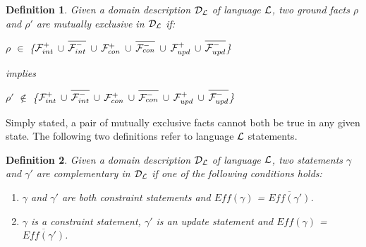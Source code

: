 \documentclass[11pt, twocolumn]{article}
\newtheorem{vdefinition}{Definition}
\newenvironment{vquote}
  {\begin{list}{}{\leftmargin 1em}\item[]}
  {\end{list}}
\begin{document}
    \begin{vdefinition}
      \label{def-mutex}
      Given a domain description ${\cal D_{L}}$ of language ${\cal L}$,
      two ground facts $\rho$ and $\rho'$ are {\em mutually exclusive}
      in ${\cal D_{L}}$ if:
      \begin{vquote}
        $\rho$ $\in$ \{${\cal F}^{+}_{int}$ $\cup$
        $\overline{{\cal F}^{-}_{int}}$ $\cup$ ${\cal F}^{+}_{con}$ $\cup$
        $\overline{{\cal F}^{-}_{con}}$ $\cup$ ${\cal F}^{+}_{upd}$ $\cup$
        $\overline{{\cal F}^{-}_{upd}}$\}

        implies

        $\rho'$ $\not\in$ \{${\cal F}^{+}_{int}$ $\cup$
        $\overline{{\cal F}^{-}_{int}}$ $\cup$ ${\cal F}^{+}_{con}$ $\cup$
        $\overline{{\cal F}^{-}_{con}}$ $\cup$ ${\cal F}^{+}_{upd}$ $\cup$
        $\overline{{\cal F}^{-}_{upd}}$\}
      \end{vquote}
    \end{vdefinition}

    Simply stated, a pair of mutually exclusive facts cannot both be true
    in any given state. The following two definitions refer to language
    ${\cal L}$ statements.

    \begin{vdefinition}
      \label{def-comp}
      Given a domain description ${\cal D_{L}}$ of language ${\cal L}$,
      two statements $\gamma$ and $\gamma'$ are {\em complementary} in
      ${\cal D_{L}}$ if one of the following conditions holds:
      \begin{enumerate}
        \item
          $\gamma$ and $\gamma'$ are both constraint statements and
          $Eff(\gamma)$ = $\overline{Eff(\gamma')}$.
        \item
          $\gamma$ is a constraint statement, $\gamma'$ is an update
          statement and $Eff(\gamma)$ = $\overline{Eff(\gamma')}$.
      \end{enumerate}
    \end{vdefinition}
\end{document}
